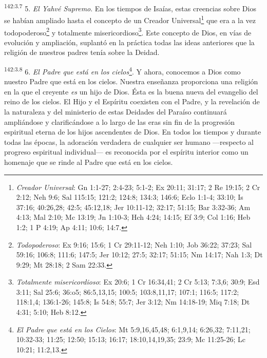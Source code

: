 \par
\textsuperscript{142:3.7} 5. \textit{El Yahvé Supremo}. En los tiempos de Isaías, estas creencias sobre Dios se habían ampliado hasta el concepto de un Creador Universal\footnote{\textit{Creador Universal}: Gn 1:1-27; 2:4-23; 5:1-2; Ex 20:11; 31:17; 2 Re 19:15; 2 Cr 2:12; Neh 9:6; Sal 115:15; 121:2; 124:8; 134:3; 146:6; Eclo 1:1-4; 33:10; Is 37:16; 40:26,28; 42:5; 45:12,18; Jer 10:11-12; 32:17; 51:15; Bar 3:32-36; Am 4:13; Mal 2:10; Mc 13:19; Jn 1:10-3; Hch 4:24; 14:15; Ef 3:9; Col 1:16; Heb 1:2; 1 P 4:19; Ap 4:11; 10:6; 14:7.} que era a la vez todopoderoso\footnote{\textit{Todopoderoso}: Ex 9:16; 15:6; 1 Cr 29:11-12; Neh 1:10; Job 36:22; 37:23; Sal 59:16; 106:8; 111:6; 147:5; Jer 10:12; 27:5; 32:17; 51:15; Nm 14:17; Nah 1:3; Dt 9:29; Mt 28:18; 2 Sam 22:33.} y totalmente misericordioso\footnote{\textit{Totalmente misericordioso}: Ex 20:6; 1 Cr 16:34,41; 2 Cr 5:13; 7:3,6; 30:9; Esd 3:11; Sal 25:6; 36:o5; 86:5,13,15; 100:5; 103:8,11,17; 107:1; 116:5; 117:2; 118:1,4; 136:1-26; 145:8; Is 54:8; 55:7; Jer 3:12; Nm 14:18-19; Miq 7:18; Dt 4:31; 5:10; Heb 8:12.}. Este concepto de Dios, en vías de evolución y ampliación, suplantó en la práctica todas las ideas anteriores que la religión de nuestros padres tenía sobre la Deidad.

\par
\textsuperscript{142:3.8} 6. \textit{El Padre que está en los cielos}\footnote{\textit{El Padre que está en los Cielos}: Mt 5:9,16,45,48; 6:1,9,14; 6:26,32; 7:11,21; 10:32-33; 11:25; 12:50; 15:13; 16:17; 18:10,14,19,35; 23:9; Mc 11:25-26; Lc 10:21; 11:2,13.}. Y ahora, conocemos a Dios como nuestro Padre que está en los cielos. Nuestra enseñanza proporciona una religión en la que el creyente \textit{es} un hijo de Dios. Ésta es la buena nueva del evangelio del reino de los cielos. El Hijo y el Espíritu coexisten con el Padre, y la revelación de la naturaleza y del ministerio de estas Deidades del Paraíso continuará ampliándose y clarificándose a lo largo de las eras sin fin de la progresión espiritual eterna de los hijos ascendentes de Dios. En todos los tiempos y durante todas las épocas, la adoración verdadera de cualquier ser humano ---respecto al progreso espiritual individual--- es reconocida por el espíritu interior como un homenaje que se rinde al Padre que está en los cielos.

